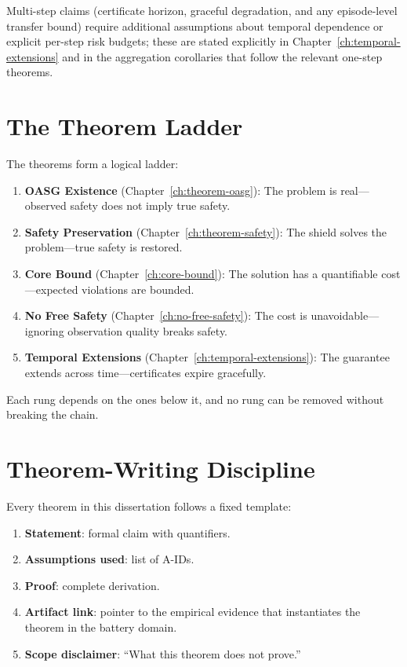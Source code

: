 Multi-step claims (certificate horizon, graceful degradation, and any
episode-level transfer bound) require additional assumptions about temporal
dependence or explicit per-step risk budgets; these are stated explicitly in
Chapter~\ref{ch:temporal-extensions} and in the aggregation corollaries that
follow the relevant one-step theorems.

\section{The Theorem Ladder}

The theorems form a logical ladder:

\begin{enumerate}
  \item \textbf{OASG Existence} (Chapter~\ref{ch:theorem-oasg}):
    The problem is real---observed safety does not imply true safety.
  \item \textbf{Safety Preservation} (Chapter~\ref{ch:theorem-safety}):
    The shield solves the problem---true safety is restored.
  \item \textbf{Core Bound} (Chapter~\ref{ch:core-bound}):
    The solution has a quantifiable cost---expected violations are bounded.
  \item \textbf{No Free Safety} (Chapter~\ref{ch:no-free-safety}):
    The cost is unavoidable---ignoring observation quality breaks safety.
  \item \textbf{Temporal Extensions} (Chapter~\ref{ch:temporal-extensions}):
    The guarantee extends across time---certificates expire gracefully.
\end{enumerate}

Each rung depends on the ones below it, and no rung can be removed
without breaking the chain.

\section{Theorem-Writing Discipline}

Every theorem in this dissertation follows a fixed template:

\begin{enumerate}
  \item \textbf{Statement}: formal claim with quantifiers.
  \item \textbf{Assumptions used}: list of A-IDs.
  \item \textbf{Proof}: complete derivation.
  \item \textbf{Artifact link}: pointer to the empirical evidence that
    instantiates the theorem in the battery domain.
  \item \textbf{Scope disclaimer}: ``What this theorem does not prove.''
\end{enumerate}

